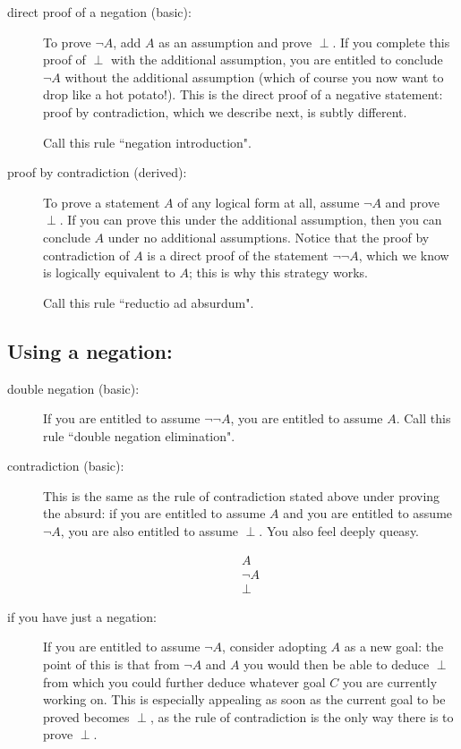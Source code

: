 \documentclass[12pt]{book}
\begin{document}
\begin{description}

\item[direct proof of a negation (basic):]  To prove $\neg A$, add $A$ as an assumption and prove $\perp$.  If you complete this proof of $\perp$ with the additional assumption, you are entitled to conclude $\neg A$ without the additional assumption (which of course you now want to drop like a hot potato!).  This is the direct proof of a negative statement:  proof by contradiction, which we describe next, is subtly different.

Call this rule ``negation introduction".

\item[proof by contradiction (derived):]  To prove a statement $A$ of any logical form at all, assume $\neg A$ and prove $\perp$.
If you can prove this under the additional assumption, then you can conclude $A$ under no additional assumptions.  Notice that the proof by contradiction of $A$ is a direct proof of the statement $\neg\neg A$, which we know is logically equivalent to $A$; this is why this strategy works.

Call this rule ``reductio ad absurdum".

\end{description}

\subsection{Using a negation:}

\begin{description}

\item[double negation (basic):]  If you are entitled to assume $\neg\neg A$, you are entitled to assume $A$.  Call this rule ``double negation elimination".

\item[contradiction (basic):]  This is the same as the rule of contradiction stated above under proving the absurd:
if you are entitled to assume $A$ and you are entitled to assume $\neg A$, you are also entitled to assume $\perp$.  You also feel deeply queasy.

$$\begin{array}{r} A \\ \neg A \\ \hline \perp \end{array}$$

\item[if you have just a negation:] If you are entitled to assume $\neg A$, consider adopting $A$ as a new goal:  the point of this is that from $\neg A$ and $A$ you would then be able to deduce $\perp$ from which you could further deduce whatever goal $C$ you are currently working on.  This is especially appealing as soon as the current goal to be proved becomes $\perp$, as the rule of contradiction is the only way there is to prove $\perp$.

\end{description}
\end{document}
